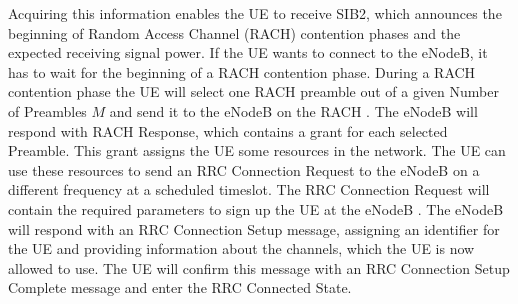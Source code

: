 \documentclass[conference]{IEEEtran}
\begin{document}
Acquiring this information enables the UE to receive SIB2, which announces the beginning of Random Access Channel (RACH) contention phases and the expected receiving signal power.
If the UE wants to connect to the eNodeB, it has to wait for the beginning of a RACH contention phase.
During a RACH contention phase the UE will select one RACH preamble out of a given Number of Preambles $M$ and send it to the eNodeB on the RACH .
The eNodeB will respond with RACH Response, which contains a grant for each selected Preamble.
This grant assigns the UE some resources in the network.
The UE can use these resources to send an RRC Connection Request to the eNodeB on a different frequency at a scheduled timeslot.
The RRC Connection Request will contain the required parameters to sign up the UE at the eNodeB .
The eNodeB will respond with an RRC Connection Setup message, assigning an identifier for the UE and providing information about the channels, which the UE is now allowed to use.
The UE will confirm this message with an RRC Connection Setup Complete message and enter the RRC Connected State.
\end{document}
